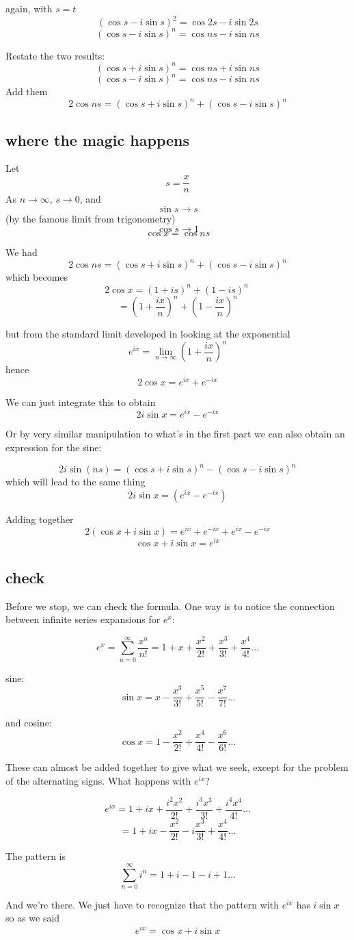 \documentclass[11pt, oneside]{article}
\begin{document}
again, with $s=t$
\[ ( \cos s - i \sin s)^2 = \cos 2s - i \sin 2s \]
\[ ( \cos s - i \sin s)^n = \cos ns - i \sin ns \]

Restate the two results:
\[ (\cos s + i \sin s)^n = \cos ns  + i \sin ns \]
\[ ( \cos s - i \sin s)^n = \cos ns - i \sin ns \]
Add them
\[ 2 \cos ns = (\cos s + i \sin s)^n + ( \cos s - i \sin s)^n \]

\subsection*{where the magic happens}
Let 
\[ s = \frac{x}{n} \]
As $n \rightarrow \infty$, $s \rightarrow 0$, and 
\[ \sin s \rightarrow s \] 
(by the famous limit from trigonometry)
\[ \cos s \rightarrow 1\]
\[ \cos x  = \cos ns \]

We had
\[ 2 \cos ns = (\cos s + i \sin s)^n + ( \cos s - i \sin s)^n \]
which becomes
\[ 2 \cos x =  (1 + i s)^n + (1 - i s)^n \  \]
\[ = (1 + \frac{ix}{n})^n + (1 - \frac{ix}{n})^n  \]

but from the standard limit developed in looking at the exponential
\[ e^{ix} = \lim_{n \rightarrow \infty} (1 + \frac{ix}{n})^n \]
hence
\[  2 \cos x  = e^{ix} + e^{-ix}  \]

We can just integrate this to obtain
\[  2i \sin x  = e^{ix} - e^{-ix} \]

Or by very similar manipulation to what's in the first part we can also obtain an expression for the sine:

\[ 2i \sin(ns) = (\cos s + i \sin s)^n - (\cos s - i \sin s)^n  \]
which will lead to the same thing
\[ 2i \sin x =  (e^{ix} - e^{-ix}) \]

Adding together
\[ 2(\cos x + i \sin x) = e^{ix} + e^{-ix} + e^{ix} - e^{-ix} \]
\[ \cos x + i \sin x = e^{ix} \]

\subsection*{check}
Before we stop, we can check the formula.  One way is to notice the connection between infinite series expansions for $e^x$:

\[ e^x = \sum_{n=0}^{\infty} \frac{x^n}{n!}  =  1 + x + \frac{x^2}{2!} + \frac{x^3}{3!} + \frac{x^4}{4!} \dots \]

sine:
\[ \sin x = x - \frac{x^3}{3!} + \frac{x^5}{5!} - \frac{x^7}{7!} \dots \]

and cosine:
\[ \cos x = 1 - \frac{x^2}{2!} + \frac{x^4}{4!} - \frac{x^6}{6!} \dots \]

These can almost be added together to give what we seek, except for the problem of the alternating signs.  What happens with $e^{ix}$?

\[ e^{ix} =  1 + ix + \frac{i^2x^2}{2!} + \frac{i^3x^3}{3!} + \frac{i^4x^4}{4!} \dots \]
\[ = 1 + ix - \frac{x^2}{2!} - i  \frac{x^3}{3!} + \frac{x^4}{4!} \dots \]

The pattern is 
\[  \sum_{n=0}^{\infty} i^n = 1 + i - 1 - i + 1 \dots \]

And we're there.  We just have to recognize that the pattern with $e^{ix}$ has $i \sin x$ so as we said
\[ e^{ix} = \cos x + i \sin x \]
\end{document}
